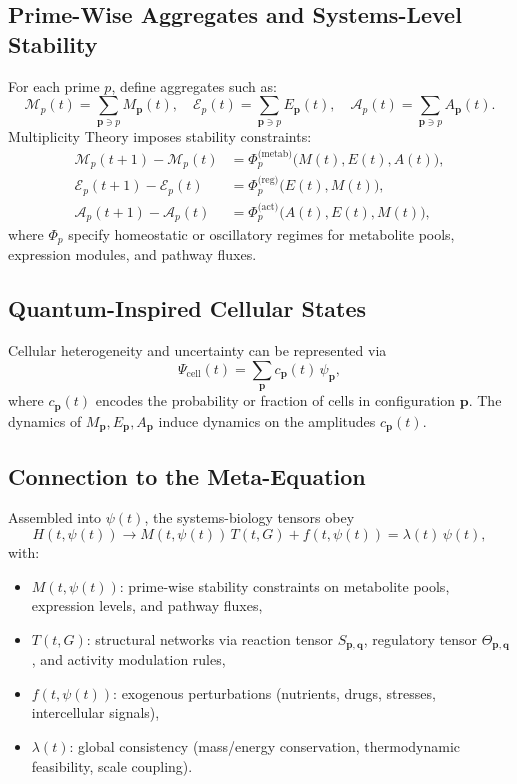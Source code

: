 \documentclass[11pt]{article}
\begin{document}
\subsection{Prime-Wise Aggregates and Systems-Level Stability}
For each prime $p$, define aggregates such as:
\[
\mathcal{M}_p(t)
=
\sum_{\mathbf{p} \ni p} M_{\mathbf{p}}(t),\quad
\mathcal{E}_p(t)
=
\sum_{\mathbf{p} \ni p} E_{\mathbf{p}}(t),\quad
\mathcal{A}_p(t)
=
\sum_{\mathbf{p} \ni p} A_{\mathbf{p}}(t).
\]
Multiplicity Theory imposes stability constraints:
\begin{align*}
\mathcal{M}_p(t+1) - \mathcal{M}_p(t)
&=
\Phi_p^{\text{(metab)}}\big(M(t), E(t), A(t)\big),\\
\mathcal{E}_p(t+1) - \mathcal{E}_p(t)
&=
\Phi_p^{\text{(reg)}}\big(E(t), M(t)\big),\\
\mathcal{A}_p(t+1) - \mathcal{A}_p(t)
&=
\Phi_p^{\text{(act)}}\big(A(t), E(t), M(t)\big),
\end{align*}
where $\Phi_p$ specify homeostatic or oscillatory regimes for metabolite pools, expression modules, and pathway fluxes.

\subsection{Quantum-Inspired Cellular States}
Cellular heterogeneity and uncertainty can be represented via
\[
\Psi_{\text{cell}}(t)
=
\sum_{\mathbf{p}} c_{\mathbf{p}}(t)\,\psi_{\mathbf{p}},
\]
where $c_{\mathbf{p}}(t)$ encodes the probability or fraction of cells in configuration $\mathbf{p}$. The dynamics of $M_{\mathbf{p}},E_{\mathbf{p}},A_{\mathbf{p}}$ induce dynamics on the amplitudes $c_{\mathbf{p}}(t)$.

\subsection{Connection to the Meta-Equation}
Assembled into $\psi(t)$, the systems-biology tensors obey
\[
H(t,\psi(t))
\to
M(t,\psi(t))\,T(t,G)
+
f(t,\psi(t))
=
\lambda(t)\,\psi(t),
\]
with:
\begin{itemize}
    \item $M(t,\psi(t))$: prime-wise stability constraints on metabolite pools, expression levels, and pathway fluxes,
    \item $T(t,G)$: structural networks via reaction tensor $S_{\mathbf{p},\mathbf{q}}$, regulatory tensor $\Theta_{\mathbf{p},\mathbf{q}}$, and activity modulation rules,
    \item $f(t,\psi(t))$: exogenous perturbations (nutrients, drugs, stresses, intercellular signals),
    \item $\lambda(t)$: global consistency (mass/energy conservation, thermodynamic feasibility, scale coupling).
\end{itemize}
\end{document}

